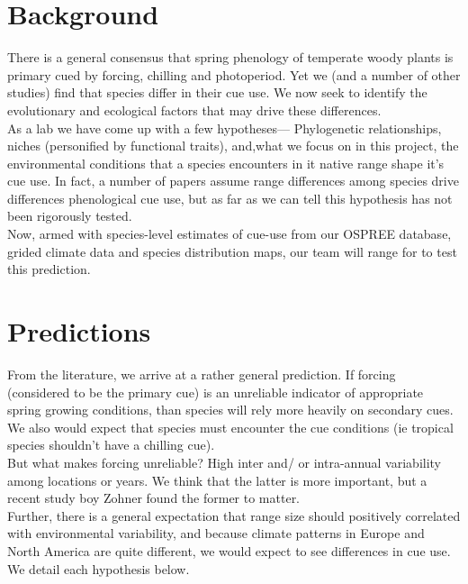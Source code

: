 \documentclass[11pt]{article}
\begin{document}
\section*{Background}
There is a general consensus that spring phenology of temperate woody plants is primary cued by forcing, chilling and photoperiod. Yet we (and a number of other studies) find that species differ in their cue use. We now seek to identify the evolutionary and ecological factors that may drive these differences.\\

As a lab we have come up with a few hypotheses--- Phylogenetic relationships, niches (personified by functional traits), and,what we focus on in this project, the environmental conditions that a species encounters in it native range shape it's cue use. In fact, a number of papers assume range differences among species drive differences phenological cue use, but as far as we can tell this hypothesis has not been rigorously tested.\\

Now, armed with species-level estimates of cue-use from our OSPREE database, grided climate data and species distribution maps, our team will range for to test this prediction.\\ 

\section*{Predictions}
From the literature, we arrive at a rather general prediction. If forcing (considered to be the primary cue) is an unreliable indicator of appropriate spring growing conditions, than species will rely more heavily on secondary cues. We also would expect that species must encounter the cue conditions (ie tropical species shouldn't have a chilling cue).\\

But what makes forcing unreliable? High inter and/ or intra-annual variability among locations or years. We think that the latter is more important, but a recent study boy Zohner found the former to matter.\\ 

Further, there is a general expectation that range size should positively correlated with environmental variability, and because climate patterns in Europe and North America are quite different, we would expect to see differences in cue use. We detail each hypothesis below.\\
\end{document}
